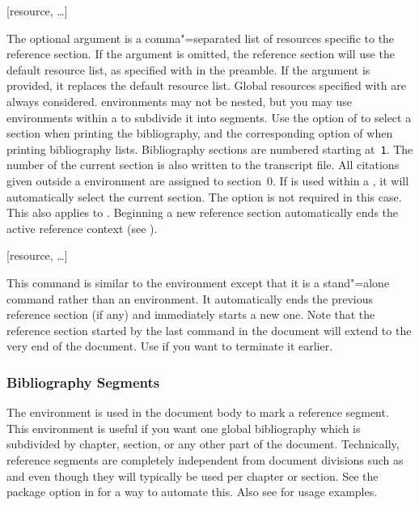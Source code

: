 \documentclass{ltxdockit}[2011/03/25]
\begin{document}
\begin{ltxsyntax}

[resource, \dots]

The optional argument is a comma"=separated list of resources specific to the reference section. If the argument is omitted, the reference section will use the default resource list, as specified with  in the preamble. If the argument is provided, it replaces the default resource list. Global resources specified with  are always considered.  environments may not be nested, but you may use  environments within a  to subdivide it into segments. Use the  option of  to select a section when printing the bibliography, and the corresponding option of  when printing bibliography lists. Bibliography sections are numbered starting at~\texttt{1}. The number of the current section is also written to the transcript file. All citations given outside a  environment are assigned to section~0. If  is used within a , it will automatically select the current section. The  option is not required in this case. This also applies to . Beginning a new reference section automatically ends the active reference context (see ).

[resource, \dots]

This command is similar to the  environment except that it is a stand"=alone command rather than an environment. It automatically ends the previous reference section (if any) and immediately starts a new one. Note that the reference section started by the last  command in the document will extend to the very end of the document. Use  if you want to terminate it earlier.

\end{ltxsyntax}

\subsubsection{Bibliography Segments}
\label{use:bib:seg}

The  environment is used in the document body to mark a reference segment. This environment is useful if you want one global bibliography which is subdivided by chapter, section, or any other part of the document. Technically, reference segments are completely independent from document divisions such as  and  even though they will typically be used per chapter or section. See the  package option in  for a way to automate this. Also see  for usage examples.
\end{document}
